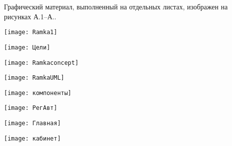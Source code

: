 
Графический материал, выполненный на отдельных листах,
изображен на рисунках А.1--А..
\setcounter{числоПлакатов}{0}

\renewcommand{\thefigure}{А.\arabic{figure}} %

\begin{landscape}
\begin{плакат}
	\centering
    \texttt{[image: Ramka1]}
    \label{pl1:image}      
\end{плакат}

\begin{плакат}
	\centering
    \texttt{[image: Цели]}
    \label{pl2:image}      
\end{плакат}

\begin{плакат}
	\centering
    \texttt{[image: Ramkaconcept]}
    \label{pl3:image}      
\end{плакат}

\begin{плакат}
	\centering
    \texttt{[image: RamkaUML]}
    \label{pl4:image}      
\end{плакат}

\begin{плакат}
	\centering
	\texttt{[image: компоненты]}
	\label{pl5:image}      
\end{плакат}

\begin{плакат}
	\centering
	\texttt{[image: РегАвт]}
	\label{pl6:image}      
\end{плакат}

\begin{плакат}
	\centering
	\texttt{[image: Главная]}
	\label{pl7:image}      
\end{плакат}

\begin{плакат}
	\centering
	\texttt{[image: кабинет]}
	\label{pl8:image}      
\end{плакат}


\end{landscape}
